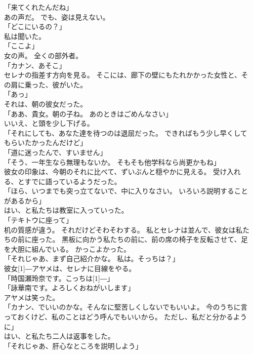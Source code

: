 \documentclass[../IHMain]{subfiles}
\begin{document}
「来てくれたんだね」\\
あの声だ。
でも、姿は見えない。\\
「どこにいるの？」\\
私は聞いた。\\
「ここよ」\\
女の声。
全くの部外者。\\
「カナン、あそこ」\\
セレナの指差す方向を見る。
そこには、廊下の壁にもたれかかった女性と、その肩に乗った、彼がいた。\\
「あっ」\\
それは、朝の彼女だった。\\
「ああ、貴女。朝の子ね。
あのときはごめんなさい」\\
いいえ、と頭を少し下げる。\\
「それにしても、あなた達を待つのは退屈だった。
できればもう少し早くしてもらいたかったんだけど」\\
「道に迷ったんで、すいません」\\
「そう、一年生なら無理もないか。
そもそも他学科なら尚更かもね」\\
彼女の印象は、今朝のそれに比べて、ずいぶんと穏やかに見える。
受け入れる、とすでに語っているようだった。\\
「ほら、いつまでも突っ立てないで、中に入りなさい。
いろいろ説明することがあるから」\\
はい、と私たちは教室に入っていった。\\
「テキトウに座って」\\
机の質感が違う。
それだけどそわそわする。
私とセレナは並んで、彼女は私たちの前に座った。
黒板に向かう私たちの前に、前の席の椅子を反転させて、足を大胆に組んでいる。
かっこよかった。\\
「それじゃあ、まず自己紹介かな。
私は。そっちは？」\\
彼女\scalebox{3}[1]{―}アヤメは、セレナに目線をやる。\\
「時国瀬玲奈です。こっちは\scalebox{3}[1]{―}」\\
「詠華南です。よろしくおねがいします」\\
アヤメは笑った。\\
「カナン、でいいのかな。そんなに堅苦しくしないでもいいよ。
今のうちに言っておくけど、私のことはどう呼んでもいいから。
ただし、私だと分かるように」\\
はい、と私たち二人は返事をした。\\
「それじゃあ、肝心なところを説明しよう」\\
\end{document}
